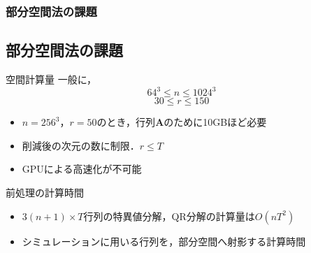 \documentclass[aspectratio=169,dvipdfmx,hyperref={bookmarks=true}]{beamer}
\begin{document}


\begin{frame}
\frametitle{部分空間法の課題}
\subsection{部分空間法の課題}
	\begin{block}{空間計算量}
		一般に，
		\[64^3 \le n \le 1024^3\]
		\[30 \le r \le 150\]
   		\begin{itemize}
			\item $n = 256^3$，$r=50$のとき，行列$\bm{A}$のために10GBほど必要
   			\item 削減後の次元の数に制限．$r \le T$
   			\item GPUによる高速化が不可能
		\end{itemize}
	\end{block}

	\begin{block}{前処理の計算時間}
 		\begin{itemize}
		\item $3(n +1)\times T$行列の特異値分解，QR分解の計算量は$O(nT^2)$
		\item	シミュレーションに用いる行列を，部分空間へ射影する計算時間
	\end{itemize}
	\end{block}
\end{frame}

\end{document}
